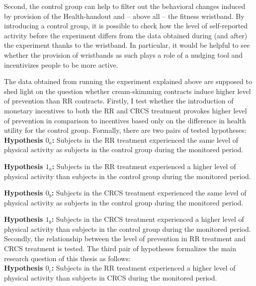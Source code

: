 \documentclass[12pt,english]{article}%
\makeatletter
\renewcommand{\subsection}{\@startsection{subsection}{2}{0mm}{-0.1\baselineskip}{0.5\baselineskip}{\normalfont\bf\flushleft}}
\makeatother
\begin{document}
Second, the control group can help to filter out the behavioral changes induced by provision of the Health-handout and -- above all -- the fitness wristband. By introducing a control group, it is possible to check how the level of self-reported activity before the experiment differs from the data obtained during (and after) the experiment thanks to the wristband. In particular, it would be helpful to see whether the provision of wristbands as such plays a role of a nudging tool and incentivizes people to be more active.

\subsection{Hypotheses}
The data obtained from running the experiment explained above are supposed to shed light on the question whether cream-skimming contracts induce higher level of prevention than RR contracts. Firstly, I test whether the introduction of monetary incentives to both the RR and CRCS treatment provokes higher level of prevention in comparison to incentives based only on the difference in health utility for the control group. Formally, there are two pairs of tested hypotheses:\\ 

\textbf{Hypothesis $0_a$:} Subjects in the RR treatment experienced the same level of physical activity as subjects in the control group during the monitored period.

\textbf{Hypothesis $1_a$:} Subjects in the RR treatment experienced a higher level of physical activity than subjects in the control group during the monitored period.

\textbf{Hypothesis $0_b$:} Subjects in the CRCS treatment experienced the same level of physical activity as subjects in the control group during the monitored period. 

\textbf{Hypothesis $1_b$:} Subjects in the CRCS treatment experienced a higher level of physical activity than subjects in the control group during the monitored period.\\

Secondly, the relationship between the level of prevention in RR treatment and CRCS treatment is tested. The third pair of hypotheses formalizes the main research question of this thesis as follows:\\

\textbf{Hypothesis $0_c$:} Subjects in the RR treatment experienced a higher level of physical activity than subjects in CRCS during the monitored period.
\end{document}
